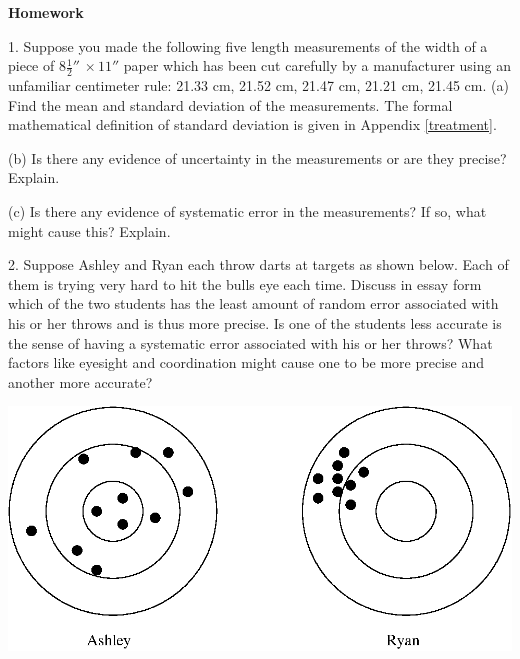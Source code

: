 \textbf{Homework} 

1. Suppose you made the following five length measurements of the width of a
piece of $8\frac{1}{2} {}''\, \times 11''$ paper which has been cut carefully by
a manufacturer using an unfamiliar centimeter rule: 21.33 cm, 21.52 cm, 21.47
cm, 21.21 cm, 21.45 cm. (a) Find the mean and standard deviation of the measurements.
The formal mathematical definition of standard deviation 
is given in Appendix \ref{treatment}. 
\vspace{30mm}

(b) Is there any evidence of uncertainty in the measurements or are they precise?
Explain. 
\vspace{20mm}

(c) Is there any evidence of systematic error in the measurements? If so, what
might cause this? Explain.
\vspace{20mm}

2. Suppose Ashley and Ryan each throw darts at targets as shown below. Each
of them is trying very hard to hit the bulls eye each time. Discuss in essay
form which of the two students has the least amount of random
error associated with his
or her throws and is thus more precise. Is one of the students less accurate
is the sense of having a systematic error associated with his or her throws?
What factors like eyesight and coordination might cause one to be more precise
and another more accurate?

\vspace{0.3cm}
{\par\centering \includegraphics{measurement_uncertainty/measurement_uncertainty_fig1.eps} \par}
\vspace{0.3cm}

